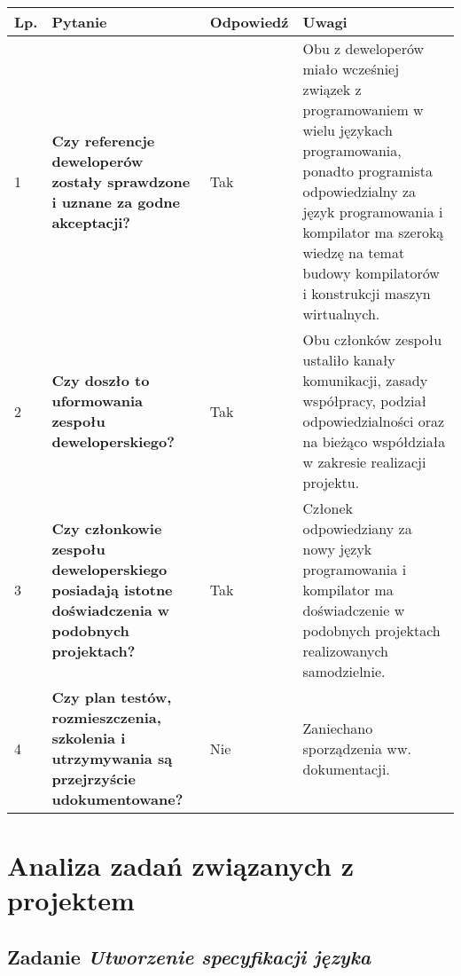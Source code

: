 \documentclass[11pt,oneside,a4paper,titlepage,onecolumn]{article}
\begin{document}
\begin{tabularx}{\textwidth}{|l|X|l|X|}
    \hline
    Lp. & Pytanie & Odpowiedź & Uwagi \\ \hline
    
    1
    & \textbf{Czy referencje deweloperów zostały sprawdzone i uznane za godne akceptacji?} 
    & Tak
    & Obu z deweloperów miało wcześniej związek z programowaniem w wielu językach programowania, ponadto programista 
    odpowiedzialny za język programowania i kompilator ma szeroką wiedzę na temat budowy kompilatorów i konstrukcji
    maszyn wirtualnych.
    \\\hline

	2
	& \textbf{Czy doszło to uformowania zespołu deweloperskiego?}
	& Tak
	& Obu członków zespołu ustaliło kanały komunikacji, zasady współpracy, podział odpowiedzialności oraz na bieżąco 
	współdziała w zakresie realizacji projektu.
	\\\hline

	3
	& \textbf{Czy członkowie zespołu deweloperskiego posiadają istotne doświadczenia w podobnych projektach?}
	& Tak
	& Członek odpowiedziany za nowy język programowania i kompilator ma doświadczenie w podobnych projektach 
	realizowanych samodzielnie.
	\\\hline
	
	4
	& \textbf{Czy plan testów, rozmieszczenia, szkolenia i utrzymywania są przejrzyście udokumentowane?} 
	& Nie
	& Zaniechano sporządzenia ww. dokumentacji.
    
    \\\hline
\end{tabularx}

\section{Analiza zadań związanych z projektem}

\subsection{Zadanie \textit{Utworzenie specyfikacji języka}}
\end{document}
